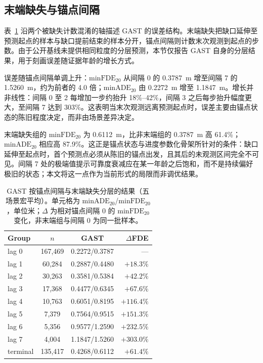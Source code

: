 \subsection{末端缺失与锚点间隔}
\label{sec:lag}

表~\ref{tab:lag} 沿两个被缺失计数混淆的轴描述 GAST 的误差结构。末端缺失把缺口延伸至预测起点的样本与缺口提前结束的样本分开，锚点间隔则计数末次观测到起点的步数。由于公开基线未提供相同粒度的分层预测，本节仅报告 GAST 自身的分层结果，用于刻画误差随证据年龄的增长方式。

误差随锚点间隔单调上升：$\mathrm{minFDE}_{20}$ 从间隔 0 的 0.3787~m 增至间隔 7 的 1.5260~m，约为前者的 4.0 倍；$\mathrm{minADE}_{20}$ 由 0.2272~m 增至 1.1847~m。增长并非线性：间隔 0 至 2 每增加一步约抬升 18\%–42\%，间隔 3 之后每步抬升幅度更大，至间隔 7 达到 303\%。这表明当末次观测远离预测起点时，误差主要由锚点状态的陈旧程度决定，而非由场景差异决定。

末端缺失组的 $\mathrm{minFDE}_{20}$ 为 0.6112~m，比非末端组的 0.3787~m 高 61.4\%；$\mathrm{minADE}_{20}$ 相应高 87.9\%。这正是锚点状态与进度参数化骨架所针对的条件：缺口延伸至起点时，首个预测点必须从陈旧的锚点出发，且其后的未观测区间完全不可见。间隔 7 处的极端值提示可靠度衰减应在某一年龄之后饱和，而不是持续偏好极旧的状态；本文将这一点作为当前形式的局限而非调优结果。

\begin{table}[t]
\centering
\footnotesize
\setlength{\tabcolsep}{3.4pt}
\caption{GAST 按锚点间隔与末端缺失分层的结果（五场景宏平均）。单元格为 $\mathrm{minADE}_{20}$/$\mathrm{minFDE}_{20}$，单位米；$\Delta$ 为相对锚点间隔 0 的 $\mathrm{minFDE}_{20}$ 变化，非末端组与间隔 0 为同一批样本。}
\label{tab:lag}
\begin{tabular}{@{}l c c r@{}}
\toprule
Group & $n$ & GAST & $\Delta$FDE \\
\midrule
lag 0 & 167{,}469 & 0.2272/0.3787 & --- \\
lag 1 & 60{,}284 & 0.2887/0.4480 & $+18.3\%$ \\
lag 2 & 30{,}263 & 0.3581/0.5384 & $+42.2\%$ \\
lag 3 & 17{,}368 & 0.4477/0.6345 & $+67.6\%$ \\
lag 4 & 10{,}763 & 0.6051/0.8195 & $+116.4\%$ \\
lag 5 & 7{,}379 & 0.7564/0.9515 & $+151.3\%$ \\
lag 6 & 5{,}356 & 0.9577/1.2590 & $+232.5\%$ \\
lag 7 & 4{,}004 & 1.1847/1.5260 & $+303.0\%$ \\
\midrule
terminal & 135{,}417 & 0.4268/0.6112 & $+61.4\%$ \\
\bottomrule
\end{tabular}
\end{table}

